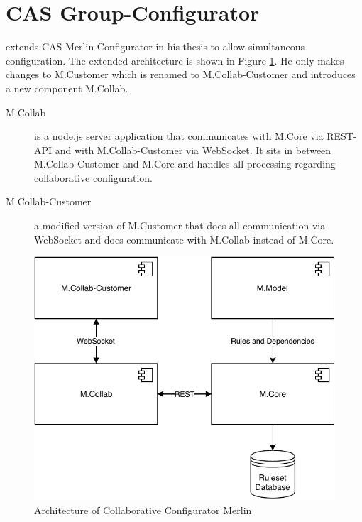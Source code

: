 \section{CAS Group-Configurator}
\label{sec:Concept:GroupConfigurator}

\citeauthor{raabKollaborativeProduktkonfigurationEchtzeit2019} extends CAS Merlin Configurator in his thesis to allow simultaneous configuration. The extended architecture is shown in Figure \ref{fig:Concept:CollaborativeConfiguratorMerlin}.
He only makes changes to M.Customer which is renamed to M.Collab-Customer and introduces a new component M.Collab.

\begin{description}
    \item[M.Collab] is a node.js server application that communicates with M.Core via REST-API and with M.Collab-Customer via WebSocket. It sits in between M.Collab-Customer and M.Core and handles all processing regarding collaborative configuration.
    \item[M.Collab-Customer] a modified version of M.Customer that does all communication via WebSocket and does communicate with M.Collab instead of M.Core.
\end{description}

\begin{figure}
    \centering
    \includegraphics{./figures/MerlinCollaborativeConfigurator.pdf}
    \caption{Architecture of Collaborative Configurator Merlin \cite[Fig. 4.3]{raabKollaborativeProduktkonfigurationEchtzeit2019}}
    \label{fig:Concept:CollaborativeConfiguratorMerlin}
\end{figure}



